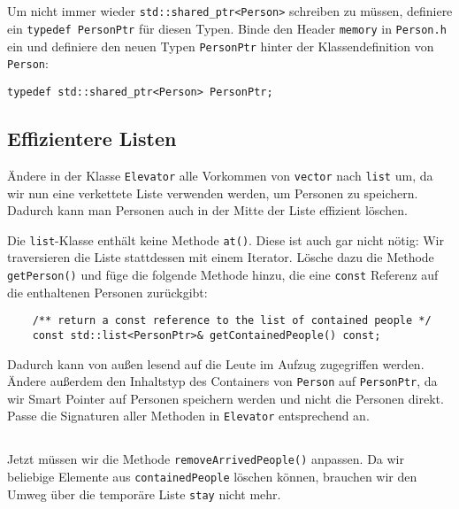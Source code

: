 
\subsection{}
Um nicht immer wieder \texttt{std::shared\_ptr<Person>} schreiben zu müssen, definiere ein \texttt{typedef PersonPtr} für diesen Typen.
Binde den Header \texttt{memory} in \texttt{Person.h} ein und definiere den neuen Typen \texttt{PersonPtr} hinter der Klassendefinition von \texttt{Person}:

\begin{lstlisting}
typedef std::shared_ptr<Person> PersonPtr;
\end{lstlisting}

\subsection{Effizientere Listen}
Ändere in der Klasse \texttt{Elevator} alle Vorkommen von \texttt{vector} nach \texttt{list} um, da wir nun eine verkettete Liste verwenden werden, um Personen zu speichern.
Dadurch kann man Personen auch in der Mitte der Liste effizient löschen.

Die \texttt{list}-Klasse enthält keine Methode \texttt{at()}.
Diese ist auch gar nicht nötig:
Wir traversieren die Liste stattdessen mit einem Iterator.
Lösche dazu die Methode \texttt{getPerson()} und füge die folgende Methode hinzu, die eine \texttt{const} Referenz auf die enthaltenen Personen zurückgibt:

\begin{lstlisting}
	/** return a const reference to the list of contained people */
	const std::list<PersonPtr>& getContainedPeople() const;
\end{lstlisting}

Dadurch kann von außen lesend auf die Leute im Aufzug zugegriffen werden.
Ändere außerdem den Inhaltstyp des Containers von \texttt{Person} auf \texttt{PersonPtr}, da wir Smart Pointer auf Personen speichern werden und nicht die Personen direkt.
Passe die Signaturen aller Methoden in \texttt{Elevator} entsprechend an.

\subsection{}
Jetzt müssen wir die Methode \texttt{removeArrivedPeople()} anpassen.
Da wir beliebige Elemente aus \texttt{containedPeople} löschen können, brauchen wir den Umweg über die temporäre Liste \texttt{stay} nicht mehr.

